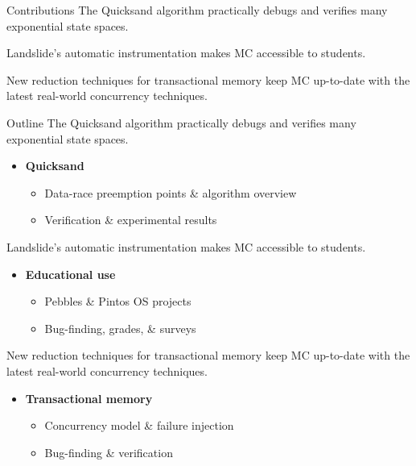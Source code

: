 \documentclass[xcolor=dvipsnames]{beamer}
\newcommand\hilight[2]{\color{#1}#2\color{black}}
\begin{document}
\begin{frame}{Contributions}
	\hilight{sect-quicksand}{The Quicksand algorithm %
	practically debugs and verifies many exponential state spaces.}
	\vspace{4.54em}

	\hilight{sect-410}{Landslide's automatic instrumentation makes MC accessible to students.}
	\vspace{4.54em}

	\hilight{sect-htm}{New reduction techniques for transactional memory keep MC up-to-date
	with the latest real-world concurrency techniques.}
	\vspace{4.54em}
\end{frame}
\begin{frame}{Outline}
	\hilight{sect-pastel-quicksand}{The Quicksand algorithm %
	practically debugs and verifies many exponential state spaces.} \\
	\begin{itemize}
		\item {\bf Quicksand}
		\begin{itemize}
			\item Data-race preemption points \& algorithm overview
			\item Verification \& experimental results
		\end{itemize}
	\end{itemize}
	\hilight{sect-pastel-410}{Landslide's automatic instrumentation makes MC accessible to students.} \\
	\begin{itemize}
		\item {\bf Educational use}
		\begin{itemize}
			\item Pebbles \& Pintos OS projects
			\item Bug-finding, grades, \& surveys
		\end{itemize}
	\end{itemize}

	\hilight{sect-pastel-htm}{New reduction techniques for transactional memory keep MC up-to-date
	with the latest real-world concurrency techniques.} \\
	\begin{itemize}
		\item {\bf Transactional memory}
		\begin{itemize}
			\item Concurrency model \& failure injection
			\item Bug-finding \& verification
		\end{itemize}
	\end{itemize}
\end{frame}
\end{document}
